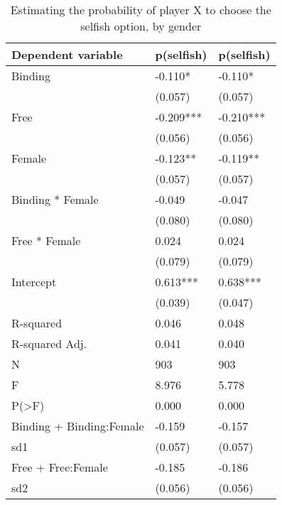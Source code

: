 \begin{table}
\centering
\caption{Estimating the probability of player X to choose the selfish option, by gender}
\label{decision_female}
\begin{tabular}{lll}
\toprule
Dependent variable & p(selfish) & p(selfish) \\
\midrule
Binding                  &    -0.110* &    -0.110* \\
                         &    (0.057) &    (0.057) \\
Free                     &  -0.209*** &  -0.210*** \\
                         &    (0.056) &    (0.056) \\
Female                   &   -0.123** &   -0.119** \\
                         &    (0.057) &    (0.057) \\
Binding * Female         &     -0.049 &     -0.047 \\
                         &    (0.080) &    (0.080) \\
Free * Female            &      0.024 &      0.024 \\
                         &    (0.079) &    (0.079) \\
Intercept                &   0.613*** &   0.638*** \\
                         &    (0.039) &    (0.047) \\
R-squared                &      0.046 &      0.048 \\
R-squared Adj.           &      0.041 &      0.040 \\
N                        &        903 &        903 \\
F                        &      8.976 &      5.778 \\
P(>F)                    &      0.000 &      0.000 \\
Binding + Binding:Female &     -0.159 &     -0.157 \\
sd1                      &    (0.057) &    (0.057) \\
Free + Free:Female       &     -0.185 &     -0.186 \\
sd2                      &    (0.056) &    (0.056) \\
\bottomrule
\end{tabular}
\end{table}
